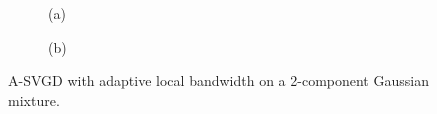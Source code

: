 \captionsetup[subfigure]{labelformat=empty}
\begin{figure}[t!]
    \centering 
\begin{subfigure}[b]{.48\textwidth} 
    \caption{(a) \label{fig:bwlocal}}
\end{subfigure}
\hfill
\centering
\begin{subfigure}[b]{0.48\textwidth}
    \caption{(b)\label{fig:slicelocal}}
\end{subfigure}

\caption{A-SVGD with adaptive local bandwidth on a 2-component Gaussian mixture.}
\label{fig:localbw}
\end{figure}


